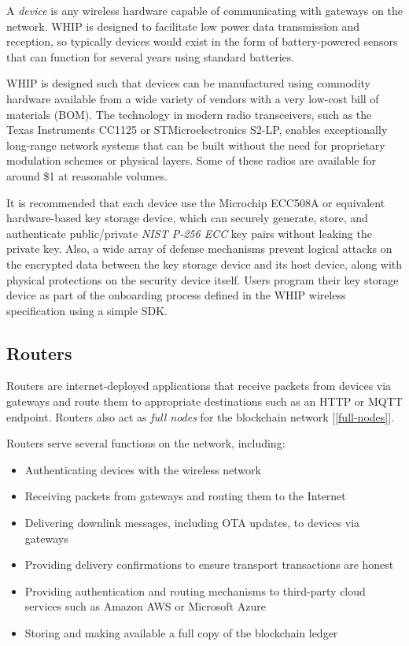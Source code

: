 \documentclass[UTF8, 10pt, nonatbib, nocopyrightspace, reprint]{sigplanconf}
\newcommand{\secref}[1]{[\autoref{#1}]}
\begin{document}
A \emph{device} is any wireless hardware capable of communicating with gateways on the network. WHIP is designed to facilitate low power data transmission and reception, so typically devices would exist in the form of battery-powered sensors that can function for several years using standard batteries.

WHIP is designed such that devices can be manufactured using commodity hardware available from a wide variety of vendors with a very low-cost bill of materials (BOM). The technology in modern radio transceivers, such as the Texas Instruments CC1125 or STMicroelectronics S2-LP, enables exceptionally long-range network systems that can be built without the need for proprietary modulation schemes or physical layers. Some of these radios are available for around \$1 at reasonable volumes.

It is recommended that each device use the Microchip ECC508A or equivalent hardware-based key storage device, which can securely generate, store, and authenticate public/private \emph{NIST P-256 ECC} \cite{nist} key pairs without leaking the private key. Also, a wide array of defense mechanisms prevent logical attacks on the encrypted data between the key storage device and its host device, along with physical protections on the security device itself. Users program their key storage device as part of the onboarding process defined in the WHIP wireless specification using a simple SDK\@.

\subsection{Routers}

Routers are internet-deployed applications that receive packets from devices via gateways and route them to appropriate destinations such as an HTTP or MQTT endpoint. Routers also act as \emph{full nodes} for the blockchain network \secref{full-nodes}.

Routers serve several functions on the network, including:

\begin{itemize}
    \item Authenticating devices with the wireless network
    \item Receiving packets from gateways and routing them to the Internet
    \item Delivering downlink messages, including OTA updates, to devices via gateways
    \item Providing delivery confirmations to ensure transport transactions are honest
    \item Providing authentication and routing mechanisms to third-party cloud services such as Amazon AWS or Microsoft Azure
    \item Storing and making available a full copy of the blockchain ledger
\end{itemize}
\end{document}
